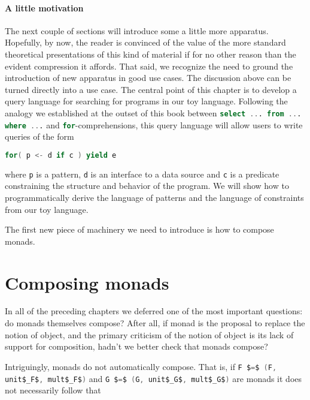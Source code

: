 \paragraph{A little motivation}

The next couple of sections will introduce some a little more
apparatus. Hopefully, by now, the reader is convinced of the value of
the more standard theoretical presentations of this kind of material
if for no other reason than the evident compression it affords. That
said, we recognize the need to ground the introduction of new
apparatus in good use cases. The discussion above can be turned
directly into a use case. The central point of this chapter is to
develop a query language for searching for programs in our toy
language. Following the analogy we established at the outset of this
book between \lstinline[language=SQL,mathescape=true]!select ... from ... where ...! and
\lstinline[language=Scala,mathescape=true]!for!-comprehensions, this
query language will allow users to write queries of the form

\begin{lstlisting}[language=Scala,mathescape=true]
  for( p <- d if c ) yield e
\end{lstlisting}

where \lstinline[language=Scala,mathescape=true]!p! is a pattern,
\lstinline[language=Scala,mathescape=true]!d! is an interface to a
data source and \lstinline[language=Scala,mathescape=true]!c! is a
predicate constraining the structure and behavior of the program. We
will show how to programmatically derive the language of patterns and
the language of constraints from our toy language.

The first new piece of machinery we need to introduce is how to
compose monads.


\section{Composing monads}

In all of the preceding chapters we deferred one of the most important
questions: do monads themselves compose? After all, if monad is the
proposal to replace the notion of object, and the primary criticism of
the notion of object is its lack of support for composition, hadn't we
better check that monads compose?

Intriguingly, monads do not automatically compose. That is, if
\lstinline[language=Scala,mathescape=true]!F $=$ (F, unit$_F$, mult$_F$)!
and \lstinline[language=Scala,mathescape=true]!G $=$ (G, unit$_G$, mult$_G$)!
are monads it does not necessarily follow that

